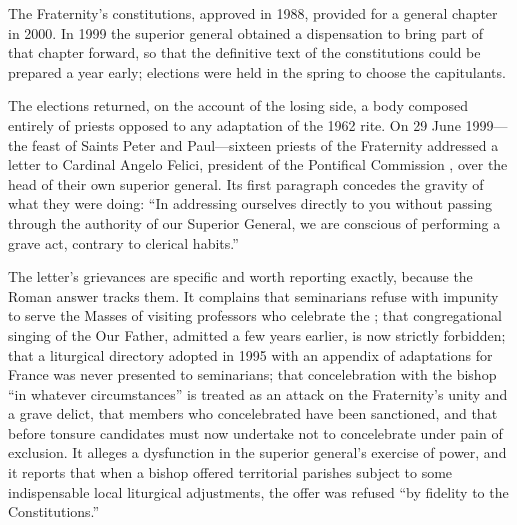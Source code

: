 The Fraternity's constitutions, approved  in 1988,
provided for a general chapter in 2000. In 1999 the superior general
obtained a dispensation to bring part of that chapter forward, so that
the definitive text of the constitutions could be prepared a year early;
elections were held in the spring to choose the capitulants.

The elections returned, on the account of the losing side, a body
composed entirely of priests opposed to any adaptation of the 1962 rite.
On 29 June 1999---the feast of Saints Peter and Paul---sixteen priests of
the Fraternity addressed a letter to Cardinal Angelo Felici, president of
the Pontifical Commission , over the head of their own
superior general. Its first paragraph concedes the gravity of what they
were doing: ``In addressing ourselves directly to you without passing
through the authority of our Superior General, we are conscious of
performing a grave act, contrary to clerical habits.''

The letter's grievances are specific and worth reporting exactly, because
the Roman answer tracks them. It complains that seminarians refuse with
impunity to serve the Masses of visiting professors who celebrate the
; that congregational singing of the Our Father,
admitted a few years earlier, is now strictly forbidden; that a
liturgical directory adopted in 1995 with an appendix of adaptations for
France was never presented to seminarians; that concelebration with the
bishop ``in whatever circumstances'' is treated as an attack on the
Fraternity's unity and a grave delict, that members who concelebrated have
been sanctioned, and that before tonsure candidates must now undertake
not to concelebrate under pain of exclusion. It alleges a dysfunction in
the superior general's exercise of power, and it reports that when a
bishop offered territorial parishes subject to some indispensable local
liturgical adjustments, the offer was refused ``by fidelity to the
Constitutions.''

